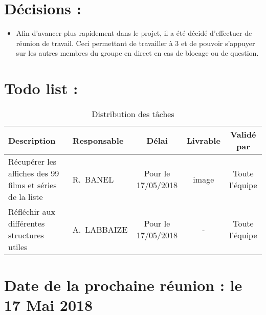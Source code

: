 \documentclass[11pt]{meetingmins}
\begin{document}
\newpage

\section{Décisions :}
\begin{itemize}
    \item Afin d'avancer plus rapidement dans le projet, il a été décidé d'effectuer de réunion de travail. Ceci permettant de travailler à 3 et de pouvoir s'appuyer sur les autres membres du groupe en direct en cas de blocage ou de question.
\end{itemize}
\section{Todo list :}
\begin{table}[h]
    \centering
    \begin{tabular}{|p{4cm}|p{3cm}|c|c|c|}
    \hline
        \rowcolor{yellow} Description  & Responsable & Délai & Livrable & Validé par 
        \tabularnewline \hline
        
        Récupérer les affiches des 99 films et séries de la liste & R.~BANEL & Pour le 17/05/2018 & image & Toute l'équipe \tabularnewline \hline
        
        
        Réfléchir aux différentes structures utiles & A.~LABBAIZE & Pour le 17/05/2018 & - & Toute l'équipe \tabularnewline \hline
        
        
        
    \end{tabular}
    \caption{Distribution des tâches}
    \label{tab:my_label}
\end{table}

\section{Date de la prochaine réunion : \textnormal{le 17 Mai 2018} }
\end{document}
